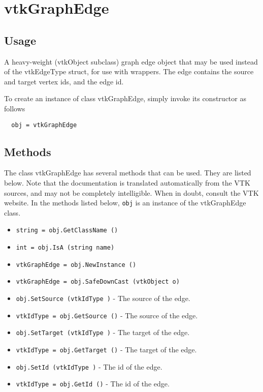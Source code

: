\section{vtkGraphEdge}

\subsection{Usage}

 A heavy-weight (vtkObject subclass) graph edge object that may be used
 instead of the vtkEdgeType struct, for use with wrappers.
 The edge contains the source and target vertex ids, and the edge id.


To create an instance of class vtkGraphEdge, simply
invoke its constructor as follows
\begin{verbatim}
  obj = vtkGraphEdge
\end{verbatim}
\subsection{Methods}

The class vtkGraphEdge has several methods that can be used.
  They are listed below.
Note that the documentation is translated automatically from the VTK sources,
and may not be completely intelligible.  When in doubt, consult the VTK website.
In the methods listed below, \verb|obj| is an instance of the vtkGraphEdge class.
\begin{itemize}
\item  \verb|string = obj.GetClassName ()|

\item  \verb|int = obj.IsA (string name)|

\item  \verb|vtkGraphEdge = obj.NewInstance ()|

\item  \verb|vtkGraphEdge = obj.SafeDownCast (vtkObject o)|

\item  \verb|obj.SetSource (vtkIdType )| -  The source of the edge.

\item  \verb|vtkIdType = obj.GetSource ()| -  The source of the edge.

\item  \verb|obj.SetTarget (vtkIdType )| -  The target of the edge.

\item  \verb|vtkIdType = obj.GetTarget ()| -  The target of the edge.

\item  \verb|obj.SetId (vtkIdType )| -  The id of the edge.

\item  \verb|vtkIdType = obj.GetId ()| -  The id of the edge.

\end{itemize}
